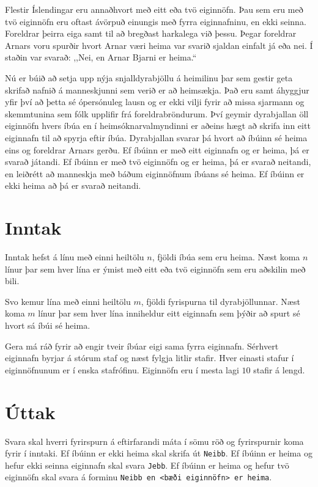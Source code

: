 
Flestir Íslendingar eru annaðhvort með eitt eða tvö eiginnöfn.
Þau sem eru með tvö eiginnöfn eru oftast ávörpuð einungis með fyrra eiginnafninu, en ekki seinna.
Foreldrar þeirra eiga samt til að bregðast harkalega við þessu.
Þegar foreldrar Arnars voru spurðir hvort Arnar væri heima var svarið sjaldan einfalt já eða nei.
Í staðin var svarað: ,,Nei, en Arnar Bjarni er heima.``

Nú er búið að setja upp nýja snjalldyrabjöllu á heimilinu þar sem gestir geta skrifað nafnið á manneskjunni sem verið er að heimsækja.
Það eru samt áhyggjur yfir því að þetta sé ópersónuleg lausn og er ekki vilji fyrir að missa sjarmann og skemmtunina sem fólk upplifir frá foreldrabröndurum.
Því geymir dyrabjallan öll eiginnöfn hvers íbúa en í heimsóknarvalmyndinni er aðeins hægt að skrifa inn eitt eiginnafn til að spyrja eftir íbúa.
Dyrabjallan svarar þá hvort að íbúinn sé heima eins og foreldrar Arnars gerðu.
Ef íbúinn er með eitt eiginnafn og er heima, þá er svarað játandi.
Ef íbúinn er með tvö eiginnöfn og er heima, þá er svarað neitandi, en leiðrétt að manneskja með báðum eiginnöfnum íbúans sé heima.
Ef íbúinn er ekki heima að þá er svarað neitandi.

\section*{Inntak}
Inntak hefst á línu með einni heiltölu $n$, fjöldi íbúa sem eru heima.
Næst koma $n$ línur þar sem hver lína er ýmist með eitt eða tvö eiginnöfn sem eru aðskilin með bili.

Svo kemur lína með einni heiltölu $m$, fjöldi fyrispurna til dyrabjöllunnar.
Næst koma $m$ línur þar sem hver lína inniheldur eitt eiginnafn sem þýðir að spurt sé hvort sá íbúi sé heima.

Gera má ráð fyrir að engir tveir íbúar eigi sama fyrra eiginnafn.
Sérhvert eiginnafn byrjar á stórum staf og næst fylgja litlir stafir.
Hver einasti stafur í eiginnöfnunum er í enska stafrófinu.
Eiginnöfn eru í mesta lagi $10$ stafir á lengd.

\section*{Úttak}
Svara skal hverri fyrirspurn á eftirfarandi máta í sömu röð og fyrirspurnir koma fyrir í inntaki.
Ef íbúinn er ekki heima skal skrifa út \texttt{Neibb}.
Ef íbúinn er heima og hefur ekki seinna eiginnafn skal svara \texttt{Jebb}.
Ef íbúinn er heima og hefur tvö eiginnöfn skal svara á forminu \texttt{Neibb en <bæði eiginnöfn> er heima}.

